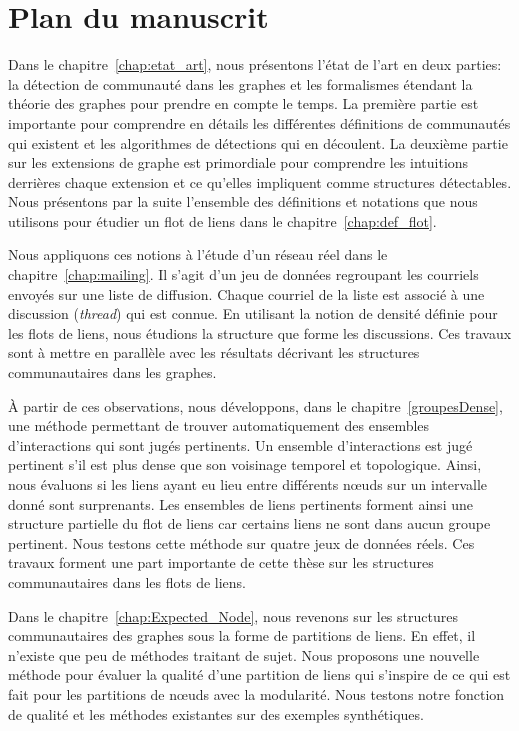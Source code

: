 \section*{Plan du manuscrit}


Dans le chapitre~\ref{chap:etat_art}, nous présentons l'état de l'art en deux parties: la détection de communauté dans les graphes et les formalismes étendant la théorie des graphes pour prendre en compte le temps.
La première partie est importante pour comprendre en détails les différentes définitions de communautés qui existent et les algorithmes de détections qui en découlent.
La deuxième partie sur les extensions de graphe est primordiale pour comprendre les intuitions derrières chaque extension et ce qu'elles impliquent comme structures détectables.
Nous présentons par la suite l'ensemble des définitions et notations que nous utilisons pour étudier un flot de liens dans le chapitre~\ref{chap:def_flot}.

Nous appliquons ces notions à l'étude d'un réseau réel dans le chapitre~\ref{chap:mailing}.
Il s'agit d'un jeu de données regroupant les courriels envoyés sur une liste de diffusion.
Chaque courriel de la liste est associé à une discussion (\emph{thread}) qui est connue.
En utilisant la notion de densité définie pour les flots de liens, nous étudions la structure que forme les discussions.
Ces travaux sont à mettre en parallèle avec les résultats décrivant les structures communautaires dans les graphes.


\`A partir de ces observations, nous développons, dans le chapitre~\ref{groupesDense}, une méthode permettant de trouver automatiquement des ensembles d'interactions qui sont jugés pertinents.
Un ensemble d'interactions est jugé pertinent s’il est plus dense que son voisinage temporel et topologique.
Ainsi, nous évaluons si les liens ayant eu lieu entre différents n\oe uds sur un intervalle donné sont surprenants.
Les  ensembles de liens pertinents forment ainsi une structure partielle du flot de liens car certains liens ne sont dans aucun groupe pertinent.
Nous testons cette méthode sur quatre jeux de données réels.
Ces travaux forment une part importante de cette thèse sur les structures communautaires dans les flots de liens.

Dans le chapitre~\ref{chap:Expected_Node}, nous revenons sur les structures communautaires des graphes sous la forme de partitions de liens.
En effet, il n'existe que peu de méthodes traitant de sujet.
Nous proposons une nouvelle méthode pour évaluer la qualité d'une partition de liens qui s'inspire de ce qui est fait pour les partitions de n\oe uds avec la modularité.
Nous testons notre fonction de qualité et les méthodes existantes sur des exemples synthétiques.

